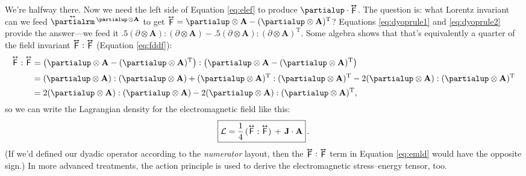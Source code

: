 \documentclass[12pt]{article}
\renewcommand{\vv}[1]{\mathbf{#1}}
\newcommand{\tightoverset}[2]{%
  \mathop{#2}\limits^{\vbox to -.5ex{\kern-0.75ex\hbox{$#1$}\vss}}}
\newcommand{\inlinedy}[1]{\tightoverset{\text{\tiny$\bm\leftrightarrow$}}{#1}}
\newcommand{\capdy}[1]{ \overset{ \text{\tiny$\bm\leftrightarrow$} }{\vphantom{\text{\small{A}}}\smash{#1}} }
\begin{document}
We're halfway there. Now we need the left side of Equation \ref{eq:elef} to produce $\partialup \cdot \inlinedy{\mathsf{F}}$. The question is: what Lorentz invariant can we feed $\inlinedy{\partialrm} {}^{\partialup \mkern2mu \otimes \vv A}$ to get $\inlinedy{\mathsf{F}} = \partialup \otimes \vv A - (\partialup \otimes \vv A)^\mathrm{T}$? Equations \ref{eq:dyoprule1} and \ref{eq:dyoprule2} provide the answer---we feed it $.5(\partialup \otimes \vv A):(\partialup \otimes \vv A) - .5(\partialup \otimes \vv A):(\partialup \otimes \vv A)^\mathrm{T}$. Some algebra shows that that's equivalently a quarter of the field invariant $\inlinedy{\mathsf{F}} : \inlinedy{\mathsf{F}}$ (Equation \ref{eq:fddf}):
\begin{equation*}
\begin{aligned}
\capdy{\mathsf{F}} : \capdy{\mathsf{F}} &= \left( \partialup \otimes \vv A - (\partialup \otimes \vv A)^\mathrm{T} \right) : \left( \partialup \otimes \vv A - (\partialup \otimes \vv A)^\mathrm{T} \right) \\[2pt]
&= (\partialup \otimes \vv A):(\partialup \otimes \vv A) + (\partialup \otimes \vv A)^\mathrm{T} : (\partialup \otimes \vv A)^\mathrm{T}  - 2 (\partialup \otimes \vv A):(\partialup \otimes \vv A)^\mathrm{T} \\[2pt]
&= 2 (\partialup \otimes \vv A):(\partialup \otimes \vv A) - 2 (\partialup \otimes \vv A):(\partialup \otimes \vv A)^\mathrm{T},
\end{aligned}
\end{equation*}
so we can write the Lagrangian density for the electromagnetic field like this:
\begin{equation}\label{eq:emld}
\boxed{\mathcal{L} = \dfrac{1}{4} \, ( \capdy{\mathsf{F}} : \capdy{\mathsf{F}} ) \, + \, \vv J \cdot \vv A} \, .
\end{equation}
(If we'd defined our dyadic operator according to the \emph{numerator} layout, then the $\inlinedy{\mathsf{F}} : \inlinedy{\mathsf{F}}$ term in Equation \ref{eq:emld} would have the opposite sign.) In more advanced treatments, the action principle is used to derive the electromagnetic stress--energy tensor, too.
\end{document}
